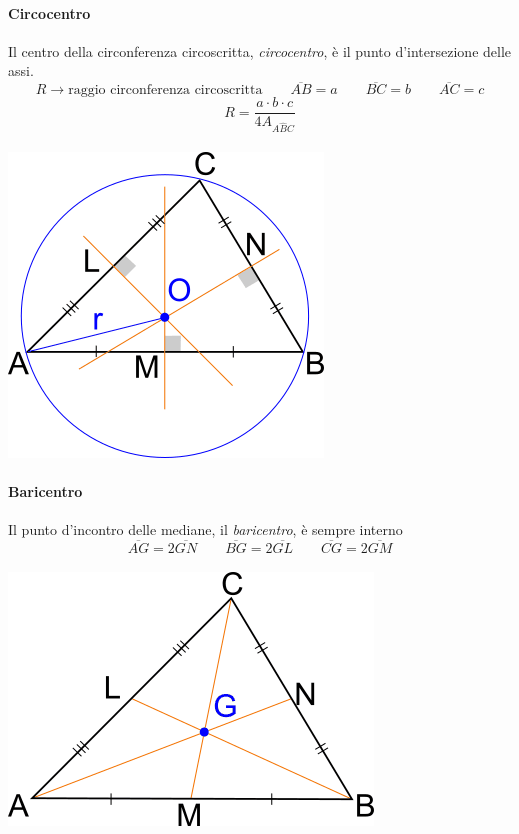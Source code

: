 \documentclass[12pt, a4paper,oneside]{report}
\begin{document}
	\paragraph{Circocentro}
	Il centro della circonferenza circoscritta, \textit{circocentro}, è il punto d'intersezione delle assi.
	\[
	R\to\text{raggio circonferenza circoscritta}\qquad\overline{AB}=a\qquad\overline{BC}=b\qquad\overline{AC}=c
	\]
	\[
	R=\frac{a\cdot b\cdot c}{4A_{A\hat{B}C}}
	\]
	\\
	\includegraphics{Out.jpg}
	\paragraph{Baricentro}
	Il punto d'incontro delle mediane, il \textit{baricentro}, è sempre interno	
	\[
	\overline{AG}=2\overline{GN} \qquad \overline{BG}=2\overline{GL} \qquad \overline{CG}=2\overline{GM}
	\]
	\\
	\includegraphics{Bar.jpg}
\end{document}
